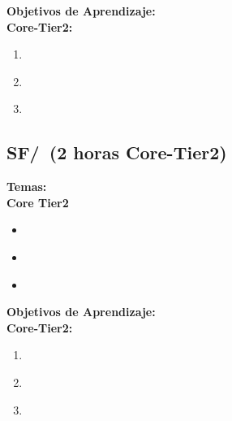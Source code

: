 \noindent \textbf{Objetivos de Aprendizaje:}\\
\noindent \textbf{Core-Tier2:}
\begin{enumerate}
	\setcounter{enumi}{0}
	\item \SFProximityLOExplainTheLocality\xspace[\SFProximityLOExplainTheLocalityLevel]\label{sec:BOK:SFProximityLOExplainTheLocality}
	\item \SFProximityLODescribeWhyAre\xspace[\SFProximityLODescribeWhyAreLevel]\label{sec:BOK:SFProximityLODescribeWhyAre}
	\item \SFProximityLOCalculateAverage\xspace[\SFProximityLOCalculateAverageLevel]\label{sec:BOK:SFProximityLOCalculateAverage}
\end{enumerate}


\subsection{SF/\SFVirtualizationandIsolation~(2 horas Core-Tier2)}\label{sec:BOK:SFVirtualizationandIsolation}
\noindent \textbf{Temas:}\\
\noindent \textbf{Core Tier2}
\begin{itemize}
	\item \SFVirtualizationandIsolationTopicRationale\label{sec:BOK:SFVirtualizationandIsolationTopicRationale}
	\item \SFVirtualizationandIsolationTopicLevels\label{sec:BOK:SFVirtualizationandIsolationTopicLevels}
	\item \SFVirtualizationandIsolationTopicMethods\label{sec:BOK:SFVirtualizationandIsolationTopicMethods}
\end{itemize}


\noindent \textbf{Objetivos de Aprendizaje:}\\
\noindent \textbf{Core-Tier2:}
\begin{enumerate}
	\setcounter{enumi}{0}
	\item \SFVirtualizationandIsolationLOExplainWhyImportant\xspace[\SFVirtualizationandIsolationLOExplainWhyImportantLevel]\label{sec:BOK:SFVirtualizationandIsolationLOExplainWhyImportant}
	\item \SFVirtualizationandIsolationLODescribeHowOfCreate\xspace[\SFVirtualizationandIsolationLODescribeHowOfCreateLevel]\label{sec:BOK:SFVirtualizationandIsolationLODescribeHowOfCreate}
	\item \SFVirtualizationandIsolationLOMeasureThe\xspace[\SFVirtualizationandIsolationLOMeasureTheLevel]\label{sec:BOK:SFVirtualizationandIsolationLOMeasureThe}
\end{enumerate}


